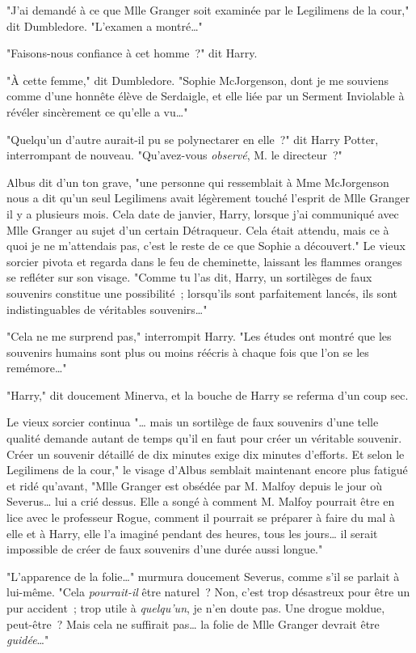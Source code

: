 "J'ai demandé à ce que Mlle Granger soit examinée par le Legilimens de la cour," dit Dumbledore. "L'examen a montré…"

"Faisons-nous confiance à cet homme~?" dit Harry.

"À cette femme," dit Dumbledore. "Sophie McJorgenson, dont je me souviens comme d'une honnête élève de Serdaigle, et elle liée par un Serment Inviolable à révéler sincèrement ce qu'elle a vu…"

"Quelqu'un d'autre aurait-il pu se polynectarer en elle~?" dit Harry Potter, interrompant de nouveau. "Qu'avez-vous \emph{observé}, M. le directeur~?"

Albus dit d'un ton grave, "une personne qui ressemblait à Mme McJorgenson nous a dit qu'un seul Legilimens avait légèrement touché l'esprit de Mlle Granger il y a plusieurs mois. Cela date de janvier, Harry, lorsque j'ai communiqué avec Mlle Granger au sujet d'un certain Détraqueur. Cela était attendu, mais ce à quoi je ne m'attendais pas, c'est le reste de ce que Sophie a découvert." Le vieux sorcier pivota et regarda dans le feu de cheminette, laissant les flammes oranges se refléter sur son visage. "Comme tu l'as dit, Harry, un sortilèges de faux souvenirs constitue une possibilité~; lorsqu'ils sont parfaitement lancés, ils sont indistinguables de véritables souvenirs…"

"Cela ne me surprend pas," interrompit Harry. "Les études ont montré que les souvenirs humains sont plus ou moins réécris à chaque fois que l'on se les remémore…"

"Harry," dit doucement Minerva, et la bouche de Harry se referma d'un coup sec.

Le vieux sorcier continua "… mais un sortilège de faux souvenirs d'une telle qualité demande autant de temps qu'il en faut pour créer un véritable souvenir. Créer un souvenir détaillé de dix minutes exige dix minutes d'efforts. Et selon le Legilimens de la cour," le visage d'Albus semblait maintenant encore plus fatigué et ridé qu'avant, "Mlle Granger est obsédée par M. Malfoy depuis le jour où Severus… lui a crié dessus. Elle a songé à comment M. Malfoy pourrait être en lice avec le professeur Rogue, comment il pourrait se préparer à faire du mal à elle et à Harry, elle l'a imaginé pendant des heures, tous les jours… il serait impossible de créer de faux souvenirs d'une durée aussi longue."

"L'apparence de la folie…" murmura doucement Severus, comme s'il se parlait à lui-même. "Cela \emph{pourrait-il} être naturel~? Non, c'est trop désastreux pour être un pur accident~; trop utile à \emph{quelqu'un}, je n'en doute pas. Une drogue moldue, peut-être~? Mais cela ne suffirait pas… la folie de Mlle Granger devrait être \emph{guidée}…"

